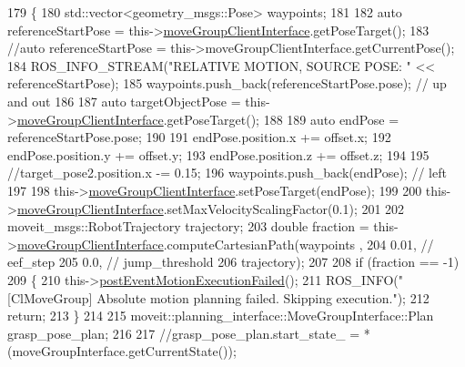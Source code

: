 \begin{DoxyCode}
179   \{
180     std::vector<geometry\_msgs::Pose> waypoints;
181 
182     \textcolor{keyword}{auto} referenceStartPose = this->\hyperlink{classsm__moveit_1_1cl__movegroup_1_1ClMoveGroup_a23acf6883455566dbab30e4367c2144d}{moveGroupClientInterface}.getPoseTarget();
183     \textcolor{comment}{//auto referenceStartPose = this->moveGroupClientInterface.getCurrentPose();}
184     ROS\_INFO\_STREAM(\textcolor{stringliteral}{"RELATIVE MOTION, SOURCE POSE: "} << referenceStartPose);
185     waypoints.push\_back(referenceStartPose.pose); \textcolor{comment}{// up and out}
186 
187     \textcolor{keyword}{auto} targetObjectPose = this->\hyperlink{classsm__moveit_1_1cl__movegroup_1_1ClMoveGroup_a23acf6883455566dbab30e4367c2144d}{moveGroupClientInterface}.getPoseTarget();
188 
189     \textcolor{keyword}{auto} endPose = referenceStartPose.pose;
190 
191     endPose.position.x += offset.x;
192     endPose.position.y += offset.y;
193     endPose.position.z += offset.z;
194 
195     \textcolor{comment}{//target\_pose2.position.x -= 0.15;}
196     waypoints.push\_back(endPose); \textcolor{comment}{// left}
197 
198     this->\hyperlink{classsm__moveit_1_1cl__movegroup_1_1ClMoveGroup_a23acf6883455566dbab30e4367c2144d}{moveGroupClientInterface}.setPoseTarget(endPose);
199 
200     this->\hyperlink{classsm__moveit_1_1cl__movegroup_1_1ClMoveGroup_a23acf6883455566dbab30e4367c2144d}{moveGroupClientInterface}.setMaxVelocityScalingFactor(0.1);
201 
202     moveit\_msgs::RobotTrajectory trajectory;
203     \textcolor{keywordtype}{double} fraction = this->\hyperlink{classsm__moveit_1_1cl__movegroup_1_1ClMoveGroup_a23acf6883455566dbab30e4367c2144d}{moveGroupClientInterface}.computeCartesianPath(waypoints
      ,
204                                                                           0.01, \textcolor{comment}{// eef\_step}
205                                                                           0.0,  \textcolor{comment}{// jump\_threshold}
206                                                                           trajectory);
207 
208     \textcolor{keywordflow}{if} (fraction == -1)
209     \{
210       this->\hyperlink{classsm__moveit_1_1cl__movegroup_1_1ClMoveGroup_a742a3504755ab7bae290c87290d2bf3f}{postEventMotionExecutionFailed}();
211       ROS\_INFO(\textcolor{stringliteral}{"[ClMoveGroup] Absolute motion planning failed. Skipping execution."});
212       \textcolor{keywordflow}{return};
213     \}
214 
215     moveit::planning\_interface::MoveGroupInterface::Plan grasp\_pose\_plan;
216 
217     \textcolor{comment}{//grasp\_pose\_plan.start\_state\_ = *(moveGroupInterface.getCurrentState());}

\end{DoxyCode}
